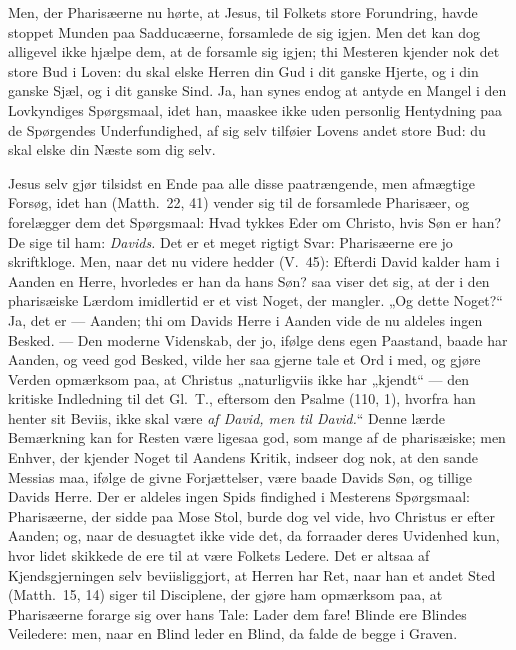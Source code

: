 \documentclass[12pt,a4paper]{book}
\begin{document}
Men, der Pharisæerne nu hørte, at Jesus, til Folkets store
Forundring, havde stoppet Munden paa Sadducæerne, forsamlede de sig igjen. Men det kan dog
alligevel ikke hjælpe dem, at de forsamle sig igjen; thi Mesteren kjender nok det store Bud
i Loven: {\large du skal elske Herren din Gud i dit ganske Hjerte, og i din ganske Sjæl, og
i dit ganske Sind.} Ja, han synes endog at antyde en Mangel i den Lovkyndiges Spørgsmaal,
idet han, maaskee ikke uden personlig Hentydning paa de Spørgendes Underfundighed, af sig
selv tilføier Lovens andet store Bud: {\large du skal elske din Næste som dig selv.}

Jesus selv gjør tilsidst en Ende paa alle disse paatrængende, men afmægtige Forsøg, idet
han (Matth.\ 22, 41) vender sig til de forsamlede Pharisæer, og forelægger dem det
Spørgsmaal: {\large Hvad tykkes Eder om Christo, hvis Søn er han?} De sige til ham:
\emph{Davids.} Det er et meget rigtigt Svar: Pharisæerne ere jo skriftkloge. Men, naar det
nu videre hedder (V.\ 45): {\large Efterdi David kalder ham i Aanden en Herre, hvorledes er
han da hans Søn?} saa viser det sig, at der i den pharisæiske Lærdom imidlertid er et vist
Noget, der mangler. „Og dette Noget?“ Ja, det er --- Aanden; thi om Davids Herre i Aanden
vide de nu aldeles ingen Besked. --- Den moderne Videnskab, der jo, ifølge dens egen
Paastand, baade har Aanden, og veed god Besked, vilde her saa gjerne tale et Ord i med, og
gjøre Verden opmærksom paa, at Christus „naturligviis ikke har „kjendt“ --- den kritiske
Indledning til det Gl.\ T., eftersom den Psalme (110, 1), hvorfra han henter sit Beviis,
ikke skal være \emph{af David, men til David.}“ Denne lærde Bemærkning kan for Resten være
ligesaa god, som mange af de pharisæiske; men Enhver, der kjender Noget til Aandens Kritik,
indseer dog nok, at den sande Messias maa, ifølge de givne Forjættelser, være baade Davids
Søn, og tillige Davids Herre. Der er aldeles ingen Spids\-%
findighed i Mesterens Spørgsmaal: Pharisæerne, der sidde paa Mose Stol, burde dog vel vide,
hvo Christus er efter Aanden; og, naar de desuagtet ikke vide det, da forraader deres
Uvidenhed kun, hvor lidet skikkede de ere til at være Folkets Ledere. Det er altsaa af
Kjendsgjerningen selv beviisliggjort, at Herren har Ret, naar han et andet Sted (Matth.\
15, 14) siger til Disciplene, der gjøre ham opmærksom paa, at Pharisæerne forarge sig over
hans Tale: {\large Lader dem fare! Blinde ere Blindes Veiledere: men, naar en Blind leder
en Blind, da falde de begge i Graven.}
\end{document}
